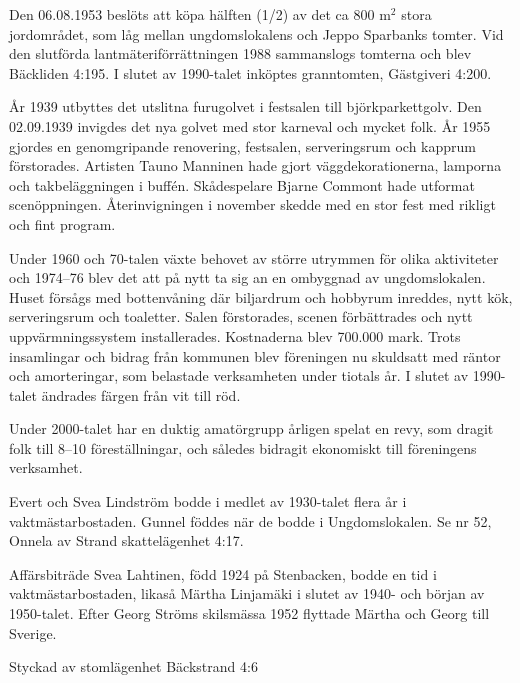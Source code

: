
Den 06.08.1953 beslöts att köpa hälften (1/2) av det ca 800 m$^2$ stora jordområdet, som låg mellan ungdomslokalens och Jeppo Sparbanks tomter. Vid den slutförda lantmäteriförrättningen 1988 sammanslogs tomterna och blev Bäckliden 4:195. I slutet av 1990-talet inköptes granntomten, Gästgiveri 4:200.

År 1939 utbyttes det utslitna furugolvet i festsalen till björkparkettgolv. Den 02.09.1939 invigdes det nya golvet med stor karneval och mycket folk. År 1955 gjordes en genomgripande renovering, festsalen, serveringsrum och kapprum förstorades. Artisten Tauno Manninen hade gjort väggdekorationerna, lamporna och takbeläggningen i buffén. Skådespelare Bjarne Commont hade utformat scenöppningen. Återinvigningen i november skedde med en stor fest med rikligt och fint program.

Under 1960 och 70-talen växte behovet av större utrymmen för olika aktiviteter och 1974--76 blev det att på nytt ta sig an en ombyggnad av ungdomslokalen. Huset försågs med bottenvåning där biljardrum och hobbyrum inreddes, nytt kök, serveringsrum och toaletter. Salen förstorades, scenen förbättrades och nytt uppvärmningssystem installerades. Kostnaderna blev 700.000 mark. Trots insamlingar och bidrag från kommunen blev föreningen nu skuldsatt med räntor och amorteringar, som belastade verksamheten under tiotals år. I slutet av 1990-talet ändrades färgen från vit till röd.

Under 2000-talet har en duktig amatörgrupp årligen spelat en revy, som dragit folk till 8--10 föreställningar, och således bidragit ekonomiskt till föreningens verksamhet.

Evert och Svea Lindström bodde i medlet av 1930-talet flera år i vaktmästarbostaden. Gunnel föddes när de bodde i Ungdomslokalen. Se nr 52, Onnela av Strand skattelägenhet 4:17.

Affärsbiträde Svea Lahtinen, född 1924 på Stenbacken, bodde en tid i vaktmästarbostaden, likaså Märtha Linjamäki i slutet av 1940- och början av 1950-talet. Efter Georg Ströms skilsmässa 1952 flyttade Märtha och Georg till Sverige.



Styckad av stomlägenhet Bäckstrand 4:6


